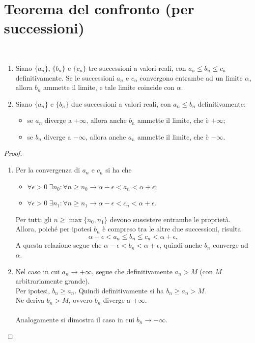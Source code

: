 \documentclass[a4paper,12pt, oneside]{book}
\begin{document}
\section{Teorema del confronto (per successioni)}
\begin{teorema} \
\begin{enumerate}
\item Siano $\{a_n\}$, $\{b_n\}$ e $\{c_n\}$ tre successioni a valori reali, con $a_n\leq b_n\leq c_n$ definitivamente. Se le successioni $a_n$ e $c_n$ convergono entrambe ad un limite $\alpha$, allora $b_n$ ammette il limite, e tale limite coincide con $\alpha$.
\item Siano $\{a_n\}$ e $\{b_n\}$ due successioni a valori reali, con $a_n\leq b_n$ definitivamente:
	\begin{itemize}
		\item se $a_n$ diverge a $+\infty$, allora anche $b_n$ ammette il limite, che è $+\infty$;
		\item se $b_n$ diverge a $-\infty$, allora anche $a_n$ ammette il limite, che è $-\infty$.
	\end{itemize}
\end{enumerate}
\end{teorema}
\begin{proof}\
\begin{enumerate}
\item Per la convergenza di $a_n$ e $c_n$ si ha che
	\begin{itemize}
		\item $\forall\epsilon>0\;\exists n_0\colon\forall n\geq n_0\to\alpha-\epsilon<a_n<\alpha+\epsilon$;
		\item $\forall\epsilon>0\;\exists n_1\colon\forall n\geq n_1\to\alpha-\epsilon<c_n<\alpha+\epsilon$.
	\end{itemize}
Per tutti gli $n\geq\max\{n_0,n_1\}$ devono sussistere entrambe le proprietà. Allora, poiché per ipotesi $b_n$ è compreso tra le altre due successioni, risulta
\[
\alpha-\epsilon<a_n\leq b_n\leq c_n<\alpha+\epsilon,
\]
A questa relazione segue che $\alpha-\epsilon<b_n<\alpha+\epsilon$, quindi anche $b_n$ converge ad $\alpha$.
\item Nel caso in cui $a_n\to +\infty$, segue che definitivamente $a_n>M$ (con $M$ arbitrariamente grande).\\
Per ipotesi, $b_n\geq a_n$. Quindi definitivamente si ha $b_n\geq a_n>M$.\\
Ne deriva $b_n>M$, ovvero $b_n$ diverge a $+\infty$.\\\\
Analogamente si dimostra il caso in cui $b_n\to -\infty$.\qedhere
\end{enumerate}
\end{proof}
\end{document}
